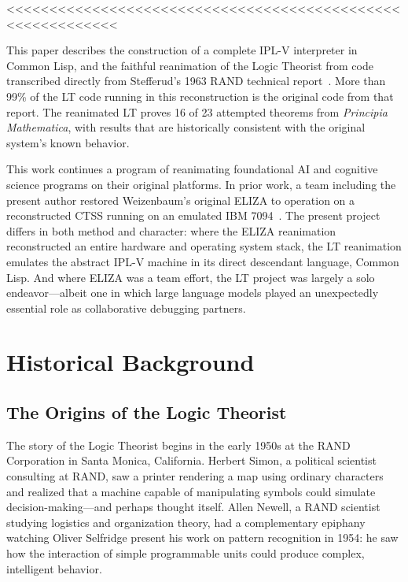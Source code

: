 \documentclass[journal]{IEEEtran}
\begin{document}
<<<<<<<<<<<<<<<<<<<<<<<<<<<<<<<<<<<<<<<<<<<<<<<<<<<<<<<<<<<

This paper describes the construction of a complete IPL-V interpreter
in Common Lisp, and the faithful reanimation of the Logic Theorist
from code transcribed directly from Stefferud's 1963 RAND technical
report~\cite{stefferud1963lt}. More than 99\% of the LT code running
in this reconstruction is the original code from that report. The
reanimated LT proves 16 of 23 attempted theorems from
\textit{Principia Mathematica}, with results that are historically
consistent with the original system's known behavior.

This work continues a program of reanimating foundational AI and
cognitive science programs on their original platforms. In prior work,
a team including the present author restored Weizenbaum's original
ELIZA to operation on a reconstructed CTSS running on an emulated IBM
7094~\cite{lane2025eliza}. The present project differs in both method
and character: where the ELIZA reanimation reconstructed an entire
hardware and operating system stack, the LT reanimation emulates the
abstract IPL-V machine in its direct descendant language, Common Lisp.
And where ELIZA was a team effort, the LT project was largely a solo
endeavor---albeit one in which large language models played an
unexpectedly essential role as collaborative debugging partners.

\section{Historical Background}
\label{sec:history}

\subsection{The Origins of the Logic Theorist}

The story of the Logic Theorist begins in the early 1950s at the RAND
Corporation in Santa Monica, California. Herbert Simon, a political
scientist consulting at RAND, saw a printer rendering a map using
ordinary characters and realized that a machine capable of
manipulating symbols could simulate decision-making---and perhaps
thought itself. Allen Newell, a RAND scientist studying logistics and
organization theory, had a complementary epiphany watching Oliver
Selfridge present his work on pattern recognition in 1954: he saw how
the interaction of simple programmable units could produce complex,
intelligent behavior.
\end{document}
